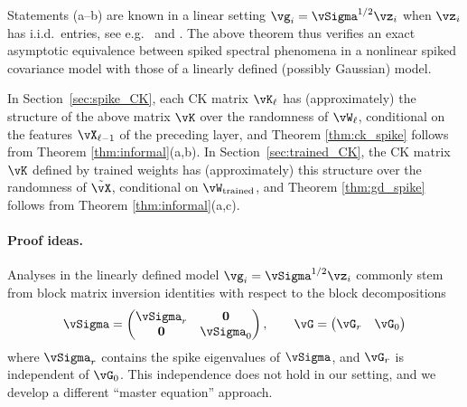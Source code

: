 Statements (a--b) are known in a linear
setting $\vg_i=\vSigma^{1/2}\vz_i$ when $\vz_i$ has i.i.d.\ entries,
see e.g.\ \citep{bai2012sample} and \cite[Theorems 11.3 and 11.5]{yao2015sample}. The above theorem thus
verifies an exact asymptotic equivalence between spiked spectral phenomena
in a nonlinear spiked covariance model with those of a linearly defined 
(possibly Gaussian) model.

In Section~\ref{sec:spike_CK}, each CK matrix $\vK_\ell$ has (approximately)
the structure of the above matrix $\vK$ over the randomness of $\vW_\ell$,
conditional on the features $\vX_{\ell-1}$ of the preceding layer, and
Theorem \ref{thm:ck_spike} follows from Theorem \ref{thm:informal}(a,b).
In Section~\ref{sec:trained_CK}, the CK matrix $\vK$ defined by trained weights
has (approximately) this structure over the randomness of $\tilde \vX$,
conditional on $\vW_{\mathrm{trained}}$, and Theorem
\ref{thm:gd_spike} follows from Theorem \ref{thm:informal}(a,c).

\paragraph{Proof ideas.} Analyses in the linearly defined model
$\vg_i=\vSigma^{1/2}\vz_i$ commonly stem from block matrix inversion identities 
with respect to the block decompositions
\[\vSigma=\begin{pmatrix}
	\vSigma_r & \mathbf{0}\\
	\mathbf{0} & \vSigma_0
\end{pmatrix}, \qquad
\vG=\begin{pmatrix} \vG_r & \vG_0 \end{pmatrix}\]
where $\vSigma_r$ contains the spike eigenvalues of $\vSigma$, and $\vG_r$ is
independent of $\vG_0$. This independence does not hold in our setting,
and we develop a different ``master equation'' approach.

